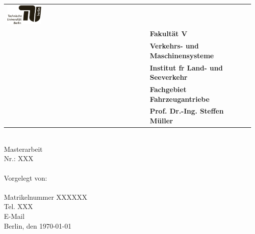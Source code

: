 \begin{titlepage}
	\sffamily
    \raggedleft
	\small
	\begin{center}		
		\color{gray}
		\begin{tabularx}{0.8\textwidth}{lX}
			\includegraphics[width=0.25\textwidth]{images/Logo_TU.pdf}&\\
			&\textbf{Fakultät V}\\
			&\textbf{Verkehrs- und Maschinensysteme}\\
			&\textbf{Institut fr Land- und Seeverkehr}\\
			&\textbf{Fachgebiet Fahrzeugantriebe}\\
			&\textbf{Prof. Dr.-Ing. Steffen Müller}\\
		\end{tabularx}	
	\end{center}
	\mbox{}\vspace{2\baselineskip}\\
	\sffamily\normalsize
	\centering   
	Masterarbeit\vspace{0.25\baselineskip}\\
	Nr.: XXX
	\vspace{2\baselineskip}\\
	\sffamily\huge{
		\textbf{\thema} \\[2cm]
	}
	\sffamily\normalsize
	Vorgelegt von:\vspace{0.5\baselineskip}\\	
	\autor\vspace{0.25\baselineskip}\\
	Matrikelnummer XXXXXX\vspace{0.25\baselineskip}\\
	Tel. XXX\vspace{0.25\baselineskip}\\
	E-Mail\vspace{0.5\baselineskip}\\
	\sffamily\large
	Berlin, den \today
	\vspace{3\baselineskip}\\


\end{titlepage}

